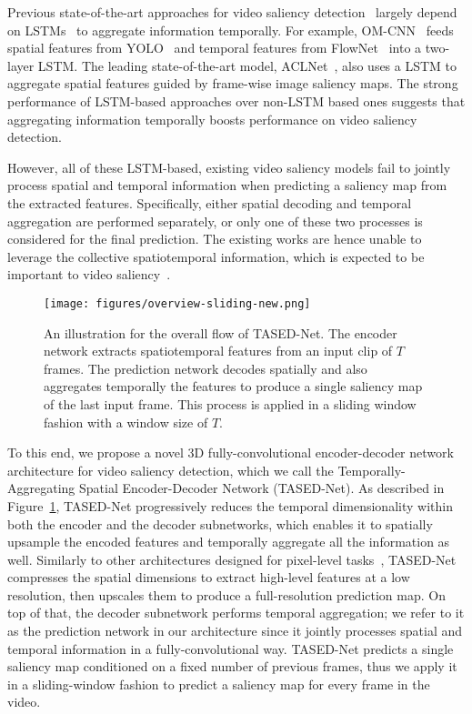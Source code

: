 \documentclass[10pt,twocolumn,letterpaper]{article}
\newcommand{\modelname}{TASED-Net}
\newcommand{\modelnamelong}{Temporally-Aggregating Spatial Encoder-Decoder}
\begin{document}
Previous state-of-the-art approaches for video saliency detection~\cite{bazzani2016recurrent, jiang2017predicting, wang2018revisiting} largely depend on LSTMs~\cite{hochreiter1997long} to aggregate information temporally. For example, OM-CNN~\cite{jiang2017predicting} feeds spatial features from YOLO~\cite{redmon2016you} and temporal features from FlowNet~\cite{dosovitskiy2015flownet} into a two-layer LSTM. The leading state-of-the-art model, ACLNet~\cite{wang2018revisiting}, also uses a LSTM to aggregate spatial features guided by frame-wise image saliency maps. The strong performance of LSTM-based approaches over non-LSTM based ones suggests that aggregating information temporally boosts performance on video saliency detection.

However, all of these LSTM-based, existing video saliency models fail to jointly process spatial and temporal information when predicting a saliency map from the extracted features. Specifically, either spatial decoding and temporal aggregation are performed separately, or only one of these two processes is considered for the final prediction. The existing works are hence unable to leverage the collective spatiotemporal information, which is expected to be important to video saliency~\cite{desimone1995neural, muller1994perceptual}.

\begin{figure}[!t]
  \centering
  \texttt{[image: figures/overview-sliding-new.png]}
  \caption{An illustration for the overall flow of \modelname{}. The encoder network extracts spatiotemporal features from an input clip of $T$ frames. The prediction network decodes spatially and also aggregates temporally the features to produce a single saliency map of the last input frame. This process is applied in a sliding window fashion with a window size of $T$.}
  \label{fig:overview}
\end{figure}

To this end, we propose a novel 3D fully-convolutional encoder-decoder network architecture for video saliency detection, which we call the \modelnamelong{} Network (\modelname{}). As described in Figure~\ref{fig:overview}, \modelname{} progressively reduces the temporal dimensionality within both the encoder and the decoder subnetworks, which enables it to spatially upsample the encoded features and temporally aggregate all the information as well. Similarly to other architectures designed for pixel-level tasks~\cite{badrinarayanan2015segnet, noh2015learning, ronneberger2015u}, \modelname{} compresses the spatial dimensions to extract high-level features at a low resolution, then upscales them to produce a full-resolution prediction map. On top of that, the decoder subnetwork performs temporal aggregation; we refer to it as the prediction network in our architecture since it jointly processes spatial and temporal information in a fully-convolutional way. \modelname{} predicts a single saliency map conditioned on a fixed number of previous frames, thus we apply it in a sliding-window fashion to predict a saliency map for every frame in the video.
\end{document}
